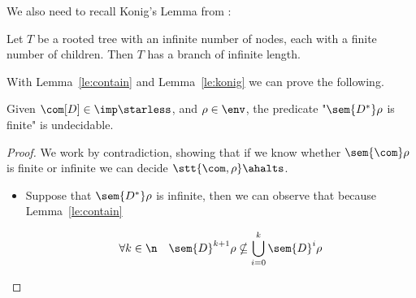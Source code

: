 We also need to recall Konig's Lemma from \cite{konig1926lemma}:

\begin{lemma}\label{le:konig}
  Let \(T\) be a rooted tree with an infinite number of nodes,
  each with a finite number of children.  Then \(T\) has a branch
  of infinite length.
\end{lemma}

With Lemma~\ref{le:contain} and Lemma~\ref{le:konig} we can prove the
following.

\begin{lemma}\label{le:infiniteness}
  Given \(\com[D]\in\imp\starless\), and \(\rho \in \env\), the
  predicate "\(\sem{D^*}\rho\) is finite" is undecidable.
\end{lemma}

\begin{proof}
  We work by contradiction, showing that if we know whether
  \(\sem{\com}\rho\) is finite or infinite we can decide
  \(\stt{\com, \rho}\ahalts\).
  \begin{itemize}
  \item Suppose that \(\sem{D^*}\rho\) is infinite, then we can
    observe that because Lemma~\ref{le:contain}

    \begin{equation}\label{eq:noncontain}
      \forall k \in \n \quad \sem{D}^{k+1}\rho \nsubseteq \bigcup_{i=0}^k\sem{D}^i\rho
    \end{equation}


\end{itemize}
\end{proof}
